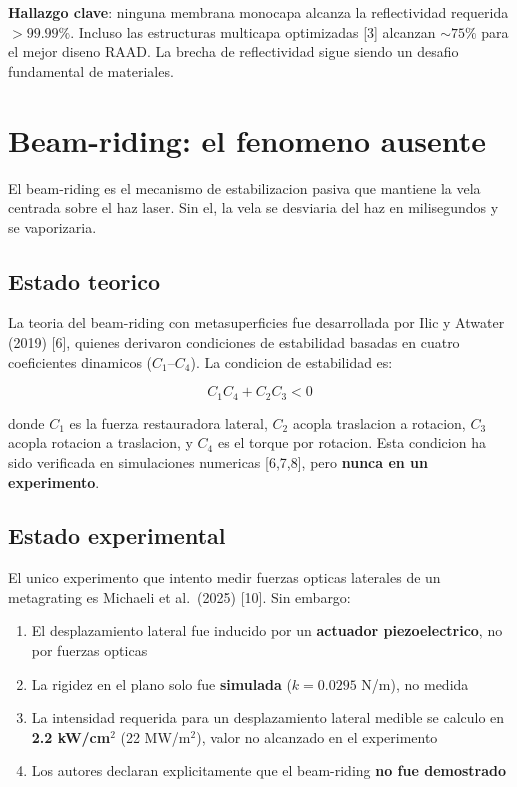 \documentclass[11pt,a4paper,onecolumn]{article}
\begin{document}
\textbf{Hallazgo clave}: ninguna membrana monocapa alcanza la reflectividad requerida $>99.99\%$. Incluso las estructuras multicapa optimizadas [3] alcanzan $\sim75\%$ para el mejor diseno RAAD. La brecha de reflectividad sigue siendo un desafio fundamental de materiales.

\section{Beam-riding: el fenomeno ausente}

El beam-riding es el mecanismo de estabilizacion pasiva que mantiene la vela centrada sobre el haz laser. Sin el, la vela se desviaria del haz en milisegundos y se vaporizaria.

\subsection{Estado teorico}

La teoria del beam-riding con metasuperficies fue desarrollada por Ilic y Atwater (2019) [6], quienes derivaron condiciones de estabilidad basadas en cuatro coeficientes dinamicos ($C_1$--$C_4$). La condicion de estabilidad es:

\begin{equation}
C_1 C_4 + C_2 C_3 < 0
\end{equation}

donde $C_1$ es la fuerza restauradora lateral, $C_2$ acopla traslacion a rotacion, $C_3$ acopla rotacion a traslacion, y $C_4$ es el torque por rotacion. Esta condicion ha sido verificada en simulaciones numericas [6,7,8], pero \textbf{nunca en un experimento}.

\subsection{Estado experimental}

El unico experimento que intento medir fuerzas opticas laterales de un metagrating es Michaeli et al.\ (2025) [10]. Sin embargo:

\begin{enumerate}
  \item El desplazamiento lateral fue inducido por un \textbf{actuador piezoelectrico}, no por fuerzas opticas
  \item La rigidez en el plano solo fue \textbf{simulada} ($k = 0.0295$ N/m), no medida
  \item La intensidad requerida para un desplazamiento lateral medible se calculo en \textbf{2.2 kW/cm$^2$} (22 MW/m$^2$), valor no alcanzado en el experimento
  \item Los autores declaran explicitamente que el beam-riding \textbf{no fue demostrado}
\end{enumerate}
\end{document}
